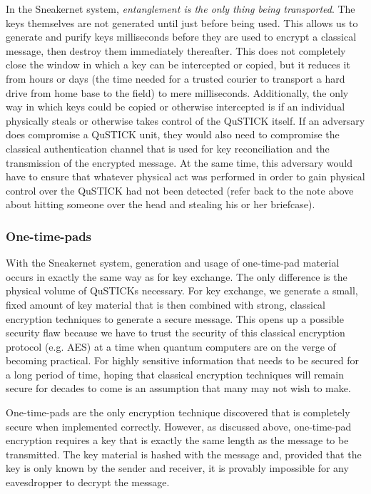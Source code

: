 \documentclass[twocolumn, aps, rmp, amsmath, amssymb, nofootinbib, superscriptaddress, longbibliography, floatfix, table-of-contents, eqsecnum]{revtex4-2}
\begin{document}
In the Sneakernet system, \textit{entanglement is the only thing being transported}. The keys themselves are not generated until just before being used. This allows us to generate and purify keys milliseconds before they are used to encrypt a classical message, then destroy them immediately thereafter. This does not completely close the window in which a key can be intercepted or copied, but it reduces it from hours or days (the time needed for a trusted courier to transport a hard drive from home base to the field) to mere milliseconds. Additionally, the only way in which keys could be copied or otherwise intercepted is if an individual physically steals or otherwise takes control of the QuSTICK itself. If an adversary does compromise a QuSTICK unit, they would also need to compromise the classical authentication channel that is used for key reconciliation and the transmission of the encrypted message. At the same time, this adversary would have to ensure that whatever physical act was performed in order to gain physical control over the QuSTICK had not been detected (refer back to the note above about hitting someone over the head and stealing his or her briefcase).  

\subsubsection{One-time-pads}

With the Sneakernet system, generation and usage of one-time-pad material occurs in exactly the same way as for key exchange. The only difference is the physical volume of QuSTICKs necessary. For key exchange, we generate a small, fixed amount of key material that is then combined with strong, classical encryption techniques to generate a secure message. This opens up a possible security flaw because we have to trust the security of this classical encryption protocol (e.g. AES) at a time when quantum computers are on the verge of becoming practical. For highly sensitive information that needs to be secured for a long period of time, hoping that classical encryption techniques will remain secure for decades to come is an assumption that many may not wish to make. 

One-time-pads are the only encryption technique discovered that is completely secure when implemented correctly. However, as discussed above, one-time-pad encryption requires a key that is exactly the same length as the message to be transmitted. The key material is hashed with the message and, provided that the key is only known by the sender and receiver, it is provably impossible for any eavesdropper to decrypt the message. 
\end{document}

